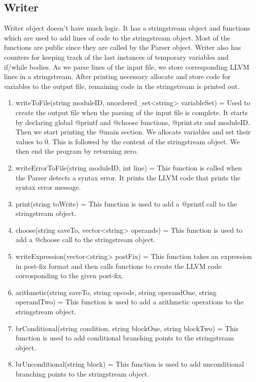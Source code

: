 \documentclass[12pt,a4paper]{article}
\begin{document}
\subsection{Writer}

Writer object doesn't have much logic. It has a stringstream object and functions which are used to add lines of code to the stringstream object. Most of the functions are public since they are called by the Parser object. Writer also has counters for keeping track of the last instances of temporary variables and if/while bodies. As we parse lines of the input file, we store corresponding LLVM lines in a stringstream. After printing necessary allocate and store code for variables to the output file, remaining code in the stringstream is printed out.

\begin{enumerate}
    \item writeToFile(string moduleID, unordered\_set<string> variableSet) = Used to create the output file when the parsing of the input file is complete. It starts by declaring global @printf and @choose functions, @print.str and moduleID. Then we start printing the @main section. We allocate variables and set their values to 0. This is followed by the content of the stringstream object. We then end the program by returning zero.
    \item writeErrorToFile(string moduleID, int line) = This function is called when the Parser detects a syntax error. It prints the LLVM code that prints the syntax error message.
    \item print(string toWrite) = This function is used to add a @printf call to the stringstream object.
    \item choose(string saveTo, vector<string> operands) = This function is used to add a @choose call to the stringstream object.
    \item writeExpression(vector<string> postFix) = This function takes an expression in post-fix format and then calls functions to create the LLVM code corrosponding to the given post-fix.
    \item arithmetic(string saveTo, string opcode, string operandOne, string operandTwo) = This function is used to add a arithmetic operations to the stringstream object.
    \item brConditional(string condition, string blockOne, string blockTwo) = This function is used to add conditional branching points to the stringstream object.
    \item brUnconditional(string block) = This function is used to add unconditional branching points to the stringstream object.

\end{enumerate}
\end{document}
